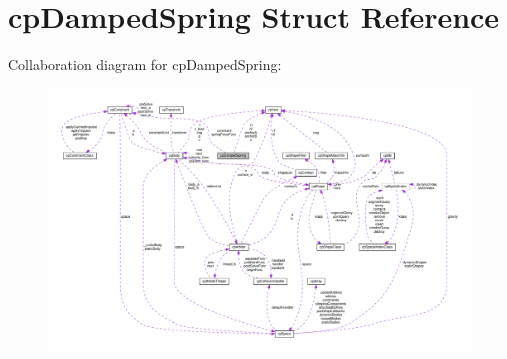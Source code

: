 \hypertarget{structcpDampedSpring}{}\section{cp\+Damped\+Spring Struct Reference}
\label{structcpDampedSpring}


Collaboration diagram for cp\+Damped\+Spring\+:
\nopagebreak
\begin{figure}[H]
\begin{center}
\leavevmode
\includegraphics[width=350pt]{structcpDampedSpring__coll__graph}
\end{center}
\end{figure}
